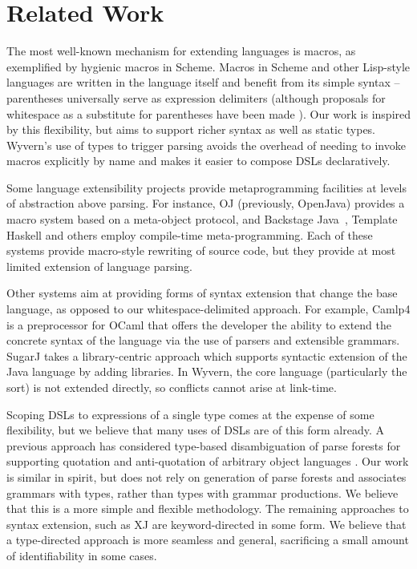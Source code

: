 \section{Related Work}
\label{s:related}
The most well-known mechanism for extending languages is macros, as exemplified by hygienic macros in Scheme. Macros in Scheme and other Lisp-style languages are written in the language itself and benefit from its simple syntax -- parentheses universally serve as expression delimiters (although proposals for whitespace as a substitute for parentheses have been made \cite{srfi-49}). Our work is inspired by this flexibility, but aims to support richer syntax as well as static types. Wyvern's use of types to trigger parsing  avoids the overhead of needing to invoke macros explicitly by name and makes it easier to compose DSLs declaratively.


Some language extensibility projects provide metaprogramming facilities at levels of abstraction above parsing. For instance, OJ (previously, OpenJava)
\cite{Tatsubori00openjava:a} provides a macro system based on a meta-object
protocol, and Backstage Java~\cite{Palmer:2011:BJM:2048066.2048137}, Template Haskell \cite{sheard2002template} and others employ compile-time meta-programming.  Each of these systems provide macro-style rewriting of source code, but they provide at most limited extension of language parsing.

Other systems aim at providing forms of syntax extension that change the base language, as opposed to our whitespace-delimited approach.  For example, Camlp4 \cite{camlp4} is a preprocessor for OCaml that offers the developer the ability to extend the concrete syntax of the language via the use of parsers and extensible grammars.  SugarJ \cite{Erdweg:2011:SLL:2048147.2048199} takes a library-centric approach which supports syntactic extension of the Java language by adding libraries. In Wyvern, the core language (particularly the  sort) is not extended directly, so conflicts cannot arise at link-time. 

Scoping DSLs to expressions of a single type comes at the expense of some flexibility, but we believe that many uses of DSLs are of this form already. A previous approach has considered type-based disambiguation of parse forests for supporting quotation and anti-quotation of arbitrary object languages \cite{bravenboer2005generalized}. Our work is similar in spirit, but does not rely on generation of parse forests and associates grammars with types, rather than types with grammar productions. We believe that this is a more simple and flexible methodology. The remaining approaches to syntax extension, such as XJ \cite{DBLP:conf/scam/ClarkSW08} are keyword-directed in some form. We believe that a type-directed approach is more seamless and general, sacrificing a small amount of identifiability in some cases.


